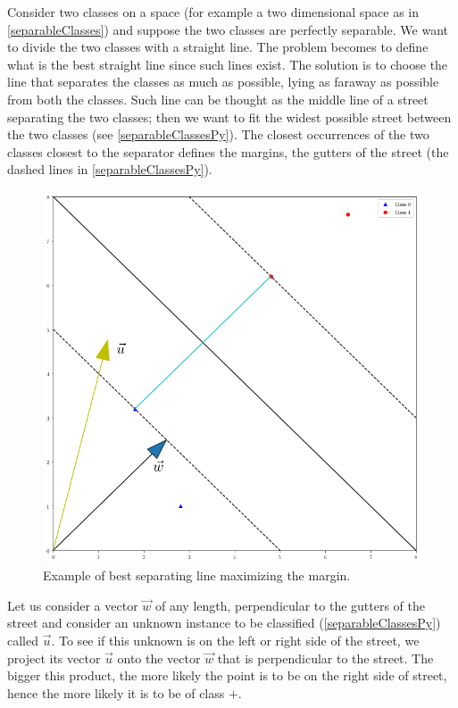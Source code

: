 Consider two classes on a space (for example a two dimensional space as in \autoref{separableClasses}) and suppose the two classes are perfectly separable. We want to divide the two classes with a straight line. The problem becomes to define what is the best straight line since such lines exist. The solution is to choose the line that separates the classes as much as possible, lying as faraway as possible from both the classes. Such line can be thought as the middle line of a street separating the two classes; then we want to fit the widest possible street between the two classes (see \autoref{separableClassesPy}). The closest occurrences of the two classes closest to the separator defines the margins, the gutters of the street (the dashed lines in \autoref{separableClassesPy}).

\begin{figure}
\centering
\includegraphics[scale=0.4]{img/separableClassesPy}
\caption{Example of best separating line maximizing the margin.}
\label{separableClassesPy}
\end{figure}

Let us consider a vector $\vec{w}$ of any length, perpendicular to the gutters of the street and consider an unknown instance to be classified (\autoref{separableClassesPy}) called $\vec{u}$. To see if this unknown is on the left or right side of the street, we project its vector $\vec{u}$ onto the vector $\vec{w}$ that is perpendicular to the street. The bigger this product, the more likely the point is to be on the right side of street, hence the more likely it is to be of class $+$.

